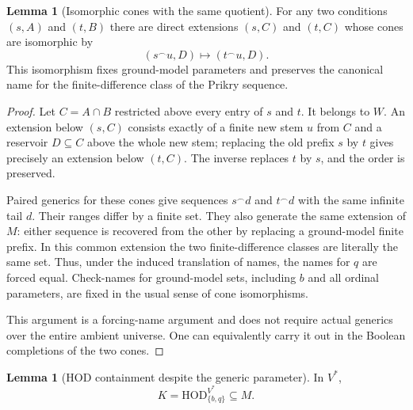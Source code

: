 \documentclass[11pt,letterpaper]{article}
\theoremstyle{definition}
\newtheorem{lemma}[definition]{Lemma}
\numberwithin{equation}{section}
\newcommand{\HOD}{\mathrm{HOD}}
\newcommand{\concat}{\mathbin{{}^{\frown}}}
\begin{document}
\begin{lemma}[Isomorphic cones with the same quotient]\label{lem:cones}
For any two conditions $(s,A)$ and $(t,B)$ there are direct extensions
$(s,C)$ and $(t,C)$ whose cones are isomorphic by
\[
 (s\concat u,D)\longmapsto(t\concat u,D).
\]
This isomorphism fixes ground-model parameters and preserves the
canonical name for the finite-difference class of the Prikry sequence.
\end{lemma}

\begin{proof}
Let $C=A\cap B$ restricted above every entry of $s$ and $t$. It belongs
to $W$. An extension below $(s,C)$ consists exactly of a finite new
stem $u$ from $C$ and a reservoir $D\subseteq C$ above the whole new
stem; replacing the old prefix $s$ by $t$ gives precisely an extension
below $(t,C)$. The inverse replaces $t$ by $s$, and the order is
preserved.

Paired generics for these cones give sequences $s\concat d$ and
$t\concat d$ with the same infinite tail $d$. Their ranges differ
by a finite set. They also generate the same extension of $M$: either
sequence is recovered from the other by replacing a ground-model
finite prefix. In this common extension the two finite-difference
classes are literally the same set. Thus, under the induced
translation of names, the names for $q$ are forced equal. Check-names
for ground-model sets, including $b$ and all ordinal parameters, are
fixed in the usual sense of cone isomorphisms.

This argument is a forcing-name argument and does not require actual
generics over the entire ambient universe. One can equivalently carry
it out in the Boolean completions of the two cones.
\end{proof}

\begin{lemma}[HOD containment despite the generic parameter]\label{lem:hod-ground}
In $V^*$,
\[
 K=\HOD_{\{b,q\}}^{V^*}\subseteq M.
\]
\end{lemma}
\end{document}
